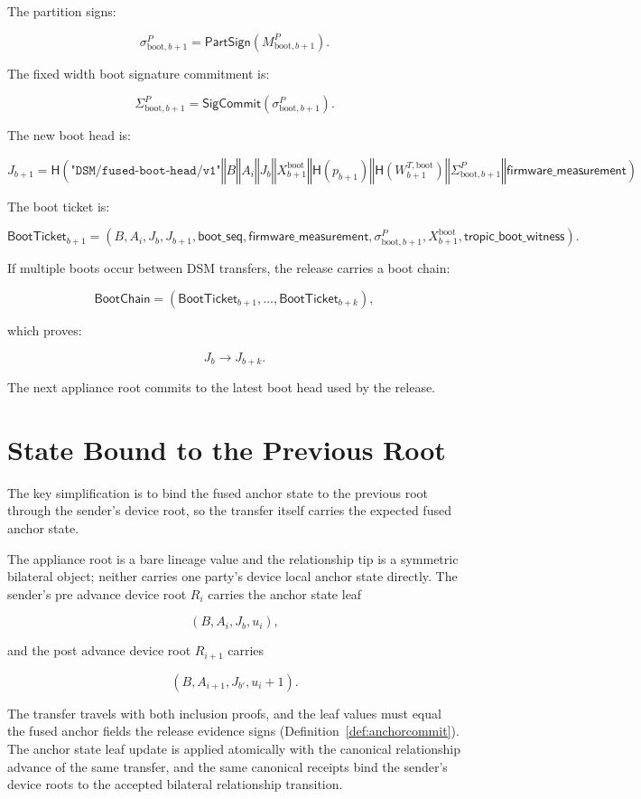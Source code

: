 \documentclass[11pt]{article}
\theoremstyle{definition}
\theoremstyle{remark}
\newcommand{\concat}{\ensuremath{\mathbin{\Vert}}}
\newcommand{\Hf}{\ensuremath{\mathsf{H}}}
\newcommand{\PartSign}{\ensuremath{\mathsf{PartSign}}}
\newcommand{\SigCommit}{\ensuremath{\mathsf{SigCommit}}}
\newcommand{\ctx}[1]{\texttt{"#1"}}
\newcommand{\Bundle}{\ensuremath{B}}
\newcommand{\Ahead}{\ensuremath{A}}
\newcommand{\Bhead}{\ensuremath{J}}
\newcommand{\BootTicket}{\ensuremath{\mathsf{BootTicket}}}
\newcommand{\BootChain}{\ensuremath{\mathsf{BootChain}}}
\begin{document}
The partition signs:

\[
\sigma^P_{\mathrm{boot},b+1}=\PartSign(M^P_{\mathrm{boot},b+1}).
\]

The fixed width boot signature commitment is:

\[
\Sigma^P_{\mathrm{boot},b+1}=\SigCommit(\sigma^P_{\mathrm{boot},b+1}).
\]

The new boot head is:

\[
\Bhead_{b+1}
=
\Hf(
  \ctx{DSM/fused-boot-head/v1}
  \concat \Bundle
  \concat \Ahead_i
  \concat \Bhead_b
  \concat X^{\mathrm{boot}}_{b+1}
  \concat \Hf(p_{b+1})
  \concat \Hf(W^{T,\mathrm{boot}}_{b+1})
  \concat \Sigma^P_{\mathrm{boot},b+1}
  \concat \mathsf{firmware\_measurement}
).
\]

The boot ticket is:

\[
\BootTicket_{b+1}
=
(
\Bundle,
\Ahead_i,
\Bhead_b,
\Bhead_{b+1},
\mathsf{boot\_seq},
\mathsf{firmware\_measurement},
\sigma^P_{\mathrm{boot},b+1},
X^{\mathrm{boot}}_{b+1},
\mathsf{tropic\_boot\_witness}
).
\]

If multiple boots occur between DSM transfers, the release carries a boot chain:

\[
\BootChain =
(\BootTicket_{b+1},\ldots,\BootTicket_{b+k}),
\]

which proves:

\[
\Bhead_b\rightarrow\Bhead_{b+k}.
\]

The next appliance root commits to the latest boot head used by the release.

\section{State Bound to the Previous Root}

The key simplification is to bind the fused anchor state to the previous root through the sender's
device root, so the transfer itself carries the expected fused anchor state.

The appliance root is a bare lineage value and the relationship tip is a symmetric bilateral
object; neither carries one party's device local anchor state directly. The sender's pre advance
device root \(R_i\) carries the anchor state leaf

\[
(\Bundle,\Ahead_i,\Bhead_b,u_i),
\]

and the post advance device root \(R_{i+1}\) carries

\[
(\Bundle,\Ahead_{i+1},\Bhead_{b'},u_i+1).
\]

The transfer travels with both inclusion proofs, and the leaf values must equal the fused anchor
fields the release evidence signs (Definition~\ref{def:anchorcommit}). The anchor state leaf
update is applied atomically with the canonical relationship advance of the same transfer, and
the same canonical receipts bind the sender's device roots to the accepted bilateral relationship
transition.
\end{document}
